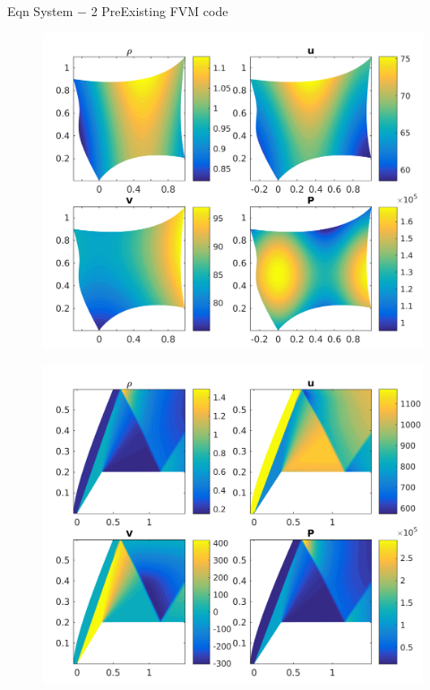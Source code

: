 \begin{frame}[t]{Eqn System $-$ 2 PreExisting FVM code}
  \minipage{\textwidth}
  \begin{figure}[!htbp]
    \includegraphics[width=1.0\linewidth]{fig/MMS_mesh6_SB_soln}
    \centering
  \end{figure}
  \endminipage\hfill
  \begin{figure}[!htbp]
    \includegraphics[width=1.0\linewidth]{fig/Inlet_mesh4_Soln}
    \centering
  \end{figure}
  \endminipage\hfill
  \endminipage
\end{frame}



